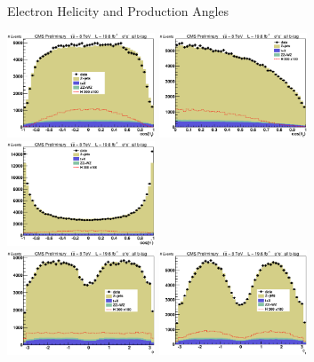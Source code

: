 \begin{frame}{Electron Helicity and Production Angles}
\begin{center}
\includegraphics[width=0.33\textwidth]{images/preselection/el/costheta1.eps}
\includegraphics[width=0.33\textwidth]{images/preselection/el/costheta2.eps}
\includegraphics[width=0.33\textwidth]{images/preselection/el/costhetast.eps}
\\
\includegraphics[width=0.33\textwidth]{images/preselection/el/phi.eps}
\includegraphics[width=0.33\textwidth]{images/preselection/el/phi1.eps}
\end{center}
\end{frame}


